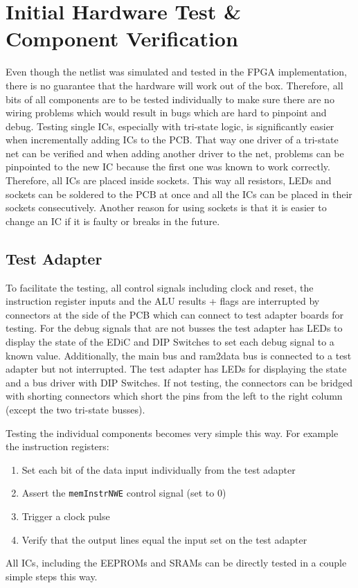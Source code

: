 \chapter{Initial Hardware Test \& Component Verification}\label{cha:eval}
Even though the netlist was simulated and tested in the \gls{FPGA} implementation, there is no guarantee that the hardware will work out of the box.
Therefore, all bits of all components are to be tested individually to make sure there are no wiring problems which would result in bugs which are hard to pinpoint and debug.
Testing single \glspl{IC}, especially with tri-state logic, is significantly easier when incrementally adding \glspl{IC} to the \gls{PCB}.
That way one driver of a tri-state net can be verified and when adding another driver to the net, problems can be pinpointed to the new \gls{IC} because the first one was known to work correctly.
Therefore, all \glspl{IC} are placed inside sockets.
This way all resistors, \glspl{LED} and sockets can be soldered to the \gls{PCB} at once and all the \glspl{IC} can be placed in their sockets consecutively.
Another reason for using sockets is that it is easier to change an \gls{IC} if it is faulty or breaks in the future.
\section{Test Adapter}\label{sec:testAdapter}
To facilitate the testing, all control signals including clock and reset, the instruction register inputs and the \gls{ALU} results + flags are interrupted by connectors at the side of the \gls{PCB} which can connect to test adapter boards for testing.
For the debug signals that are not busses the test adapter has \glspl{LED} to display the state of the \gls{EDiC} and DIP Switches to set each debug signal to a known value.
Additionally, the main bus and ram2data bus is connected to a test adapter but not interrupted.
The test adapter has \glspl{LED} for displaying the state and a bus driver with DIP Switches.
If not testing, the connectors can be bridged with shorting connectors which short the pins from the left to the right column (except the two tri-state busses).

Testing the individual components becomes very simple this way.
For example the instruction registers:
\begin{enumerate}
  \item Set each bit of the data input individually from the test adapter
  \item Assert the \texttt{memInstrNWE} control signal (set to 0)
  \item Trigger a clock pulse
  \item Verify that the output lines equal the input set on the test adapter
\end{enumerate}
All \glspl{IC}, including the \glspl{EEPROM} and \glspl{SRAM} can be directly tested in a couple simple steps this way.


